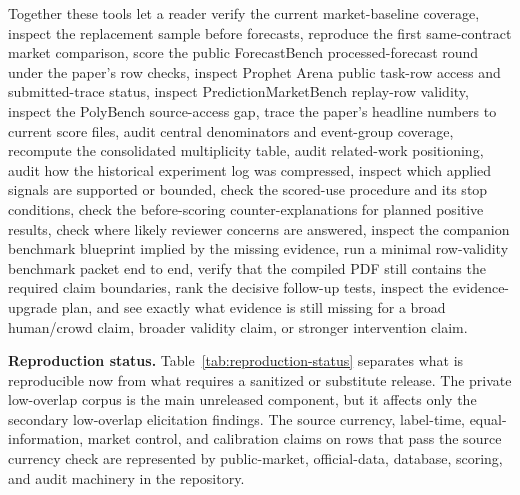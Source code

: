 \documentclass[11pt]{article}
\begin{document}
Together these tools let a reader verify the current market-baseline coverage, inspect the replacement sample before forecasts, reproduce the first same-contract market comparison, score the public ForecastBench processed-forecast round under the paper's row checks, inspect Prophet Arena public task-row access and submitted-trace status, inspect PredictionMarketBench replay-row validity, inspect the PolyBench source-access gap, trace the paper's headline numbers to current score files, audit central denominators and event-group coverage, recompute the consolidated multiplicity table, audit related-work positioning, audit how the historical experiment log was compressed, inspect which applied signals are supported or bounded, check the scored-use procedure and its stop conditions, check the before-scoring counter-explanations for planned positive results, check where likely reviewer concerns are answered, inspect the companion benchmark blueprint implied by the missing evidence, run a minimal row-validity benchmark packet end to end, verify that the compiled PDF still contains the required claim boundaries, rank the decisive follow-up tests, inspect the evidence-upgrade plan, and see exactly what evidence is still missing for a broad human/crowd claim, broader validity claim, or stronger intervention claim.

\textbf{Reproduction status.} Table~\ref{tab:reproduction-status} separates what is reproducible now from what requires a sanitized or substitute release. The private low-overlap corpus is the main unreleased component, but it affects only the secondary low-overlap elicitation findings. The source currency, label-time, equal-information, market control, and calibration claims on rows that pass the source currency check are represented by public-market, official-data, database, scoring, and audit machinery in the repository.
\end{document}
